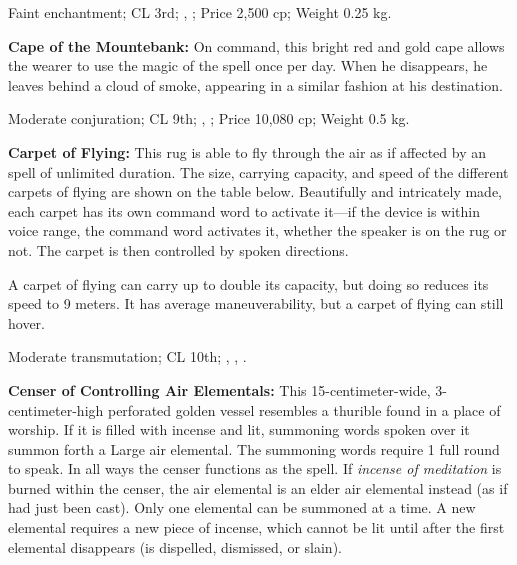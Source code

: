 Faint enchantment; CL 3rd; , ; Price 2,500 cp; Weight 0.25 kg.



\textbf{Cape of the Mountebank:} On command, this bright red and gold cape allows the wearer to use the magic of the  spell once per day. When he disappears, he leaves behind a cloud of smoke, appearing in a similar fashion at his destination.

Moderate conjuration; CL 9th; , ; Price 10,080 cp; Weight 0.5 kg.



\textbf{Carpet of Flying:} This rug is able to fly through the air as if affected by an  spell of unlimited duration. The size, carrying capacity, and speed of the different carpets of flying are shown on the table below. Beautifully and intricately made, each carpet has its own command word to activate it---if the device is within voice range, the command word activates it, whether the speaker is on the rug or not. The carpet is then controlled by spoken directions.


A carpet of flying can carry up to double its capacity, but doing so reduces its speed to 9 meters. It has average maneuverability, but a carpet of flying can still hover.

Moderate transmutation; CL 10th; , , .



\textbf{Censer of Controlling Air Elementals:} This 15-centimeter-wide, 3-centimeter-high perforated golden vessel resembles a thurible found in a place of worship. If it is filled with incense and lit, summoning words spoken over it summon forth a Large air elemental. The summoning words require 1 full round to speak. In all ways the censer functions as the  spell. If \emph{incense of meditation} is burned within the censer, the air elemental is an elder air elemental instead (as if  had just been cast). Only one elemental can be summoned at a time. A new elemental requires a new piece of incense, which cannot be lit until after the first elemental disappears (is dispelled, dismissed, or slain).

